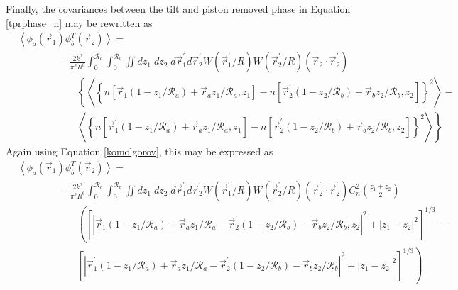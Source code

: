 Finally, the covariances between the tilt and piston removed phase in Equation \ref{tprphase_n} may be rewritten as 
\begin{equation}\label{tprphase_n2}
\begin{aligned}
&\left\langle \phi_{a}\left(\vec{r}_{1}\right) \phi^{T}_{b}\left(\vec{r}_{2}\right)\right\rangle = \\
&\quad\quad\quad\quad
-\frac{2k^{2}}{\pi^{2}R^{6}} \int_{0}^{\mathcal{R}_{a}}  \int_{0}^{\mathcal{R}_{b}} \iint dz_{1} \; dz_{2} \; d\vec{r}^{\prime}_{1}d\vec{r}^{\prime}_{2} W(\vec{r}^{\prime}_{1}/R) W(\vec{r}^{\prime}_{2}/R)
\left(\vec{r}_{2} \cdot \vec{r}^{\prime}_{2}\right)
\\
&\quad\quad\quad\quad\quad\quad
\left\{
\left\langle \left\{n\left[\vec{r}_{1}\left(1-z_{1}/\mathcal{R}_{a}\right) + \vec{r}_{a} z_{1}/\mathcal{R}_{a}, z_{1}\right] -
 n\left[\vec{r}^{\prime}_{2}\left(1-z_{2}/\mathcal{R}_{b}\right) + \vec{r}_{b} z_{2}/\mathcal{R}_{b}, z_{2}\right] \right\}^{2}\right\rangle 
\right. -
\\
&\quad\quad\quad\quad\quad\quad
\left.
\left\langle \left\{ n\left[\vec{r}^{\prime}_{1}\left(1-z_{1}/\mathcal{R}_{a}\right) + \vec{r}_{a} z_{1}/\mathcal{R}_{a}, z_{1}\right]- 
 n\left[\vec{r}^{\prime}_{2}\left(1-z_{2}/\mathcal{R}_{b}\right) + \vec{r}_{b} z_{2}/\mathcal{R}_{b}, z_{2}\right] \right\}^{2}\right\rangle
\right\}
\end{aligned}
\end{equation}
Again using Equation \ref{komolgorov}, this may be expressed as
\begin{equation}\label{tprphase_n3}
\begin{aligned}
&\left\langle \phi_{a}\left(\vec{r}_{1}\right) \phi^{T}_{b}\left(\vec{r}_{2}\right)\right\rangle = \\
&\quad\quad\quad\quad
-\frac{2k^{2}}{\pi^{2}R^{6}} \int_{0}^{\mathcal{R}_{a}}  \int_{0}^{\mathcal{R}_{b}} \iint dz_{1} \; dz_{2} \; d\vec{r}^{\prime}_{1}d\vec{r}^{\prime}_{2} W(\vec{r}^{\prime}_{1}/R) W(\vec{r}^{\prime}_{2}/R)
\left(\vec{r}^{\prime}_{2} \cdot \vec{r}^{\prime}_{2}\right)
C_{n}^{2}\left(\frac{z_{1} + z_{2}}{2}\right) 
\\
&\quad\quad\quad\quad\quad\quad
\left(
\left[\left\vert \vec{r}_{1}\left(1-z_{1}/\mathcal{R}_{a}\right) + \vec{r}_{a} z_{1}/\mathcal{R}_{a} - \vec{r}^{\prime}_{2}\left(1-z_{2}/\mathcal{R}_{b}\right) - \vec{r}_{b} z_{2}/\mathcal{R}_{b}, z_{2}\right\vert^{2}   + 
\left\vert z_{1} - z_{2} \right\vert^{2}\right]^{1/3}
\right. -
\\
&\quad\quad\quad\quad\quad\quad
\left.
\left[ \left\vert \vec{r}^{\prime}_{1}\left(1-z_{1}/\mathcal{R}_{a}\right) + \vec{r}_{a} z_{1}/\mathcal{R}_{a} - 
 \vec{r}^{\prime}_{2}\left(1-z_{2}/\mathcal{R}_{b}\right) - \vec{r}_{b} z_{2}/\mathcal{R}_{b}\right\vert^{2} + 
\left\vert z_{1} - z_{2} \right\vert^{2}\right]^{1/3}
\right)
\end{aligned}
\end{equation}

